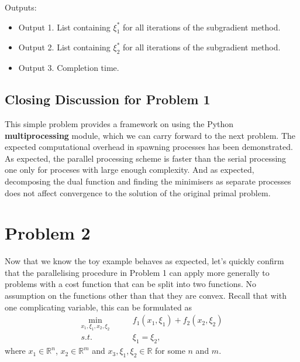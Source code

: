 \documentclass[12pt]{article}
\begin{document}
Outputs:
\begin{itemize}
	\item Output 1. List containing $\xi_1^*$ for all iterations of the subgradient method.
	\item Output 2. List containing $\xi_2^*$ for all iterations of the subgradient method.
	\item Output 3. Completion time.
\end{itemize}

\subsection*{Closing Discussion for Problem 1}

This simple problem provides a framework on using the Python \textbf{multiprocessing} module, which we can carry forward to the next problem. The expected computational overhead in spawning processes has been demonstrated. As expected, the parallel processing scheme is faster than the serial processing one only for proceses with large enough complexity. And as expected, decomposing the dual function and finding the minimisers as separate processes does not affect convergence to the solution of the original primal problem.

\section*{Problem 2}

Now that we know the toy example behaves as expected, let's quickly confirm that the parallelising procedure in Problem 1 can apply more generally to problems with a cost function that can be split into two functions. No assumption on the functions other than that they are convex. Recall that with one complicating variable, this can be formulated as
\begin{align*}
\min_{x_1,\xi_1,x_2,\xi_2}\qquad&f_1(x_1,\xi_1)+f_2(x_2,\xi_2)\\
s.t.\qquad&\xi_1=\xi_2,
\end{align*}
where $x_1\in\mathbb{R}^n$, $x_2\in\mathbb{R}^m$ and $x_3,\xi_1,\xi_2\in\mathbb{R}$ for some $n$ and $m$.
\end{document}
